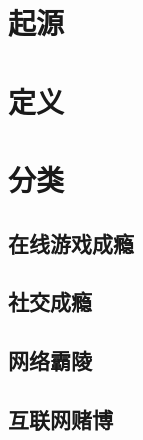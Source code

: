 

\section{起源}



\section{定义}




\section{分类}
\subsection{在线游戏成瘾}
\subsection{社交成瘾}
\subsection{网络霸陵}
\subsection{互联网赌博}

